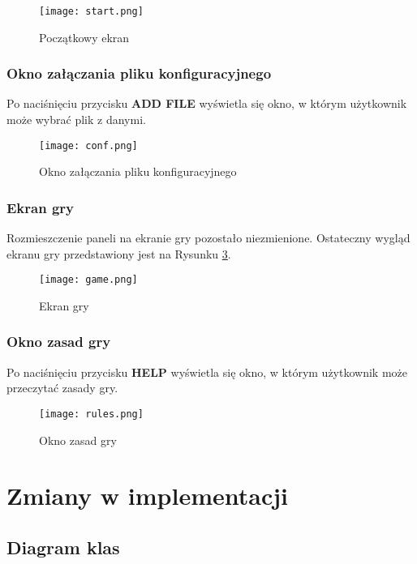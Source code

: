 \documentclass[a4paper]{article}
\begin{document}
\begin{figure}[ht]
    \centering
    \texttt{[image: start.png]}
    \color{lightgray}\caption{Pocz\k{a}tkowy ekran}
    \label{fig:start}
\end{figure}

\subsubsection{Okno za\l{}\k{a}czania pliku konfiguracyjnego}
\quad Po naci\'sni\k{e}ciu przycisku \textbf{ADD FILE} wy\'swietla si\k{e} okno, w kt\'orym u\.zytkownik mo\.ze wybra\'c plik z danymi.

\begin{figure}[ht]
    \centering
    \texttt{[image: conf.png]}
    \color{lightgray}\caption{Okno za\l{}\k{a}czania pliku konfiguracyjnego}
    \label{fig:conf}
\end{figure}

\subsubsection{Ekran gry}
\quad Rozmieszczenie paneli na ekranie gry pozosta\l{}o niezmienione. Ostateczny wygl\k{a}d ekranu gry przedstawiony jest na Rysunku \ref{fig:game}.

\begin{figure}[ht]
    \centering
    \texttt{[image: game.png]}
    \color{lightgray}\caption{Ekran gry}
    \label{fig:game}
\end{figure}

\subsubsection{Okno zasad gry}
\quad Po naci\'sni\k{e}ciu przycisku \textbf{HELP} wy\'swietla si\k{e} okno, w kt\'orym u\.zytkownik mo\.ze przeczyta\'c zasady gry.

\begin{figure}[ht]
    \centering
    \texttt{[image: rules.png]}
    \color{lightgray}\caption{Okno zasad gry}
    \label{fig:rules}
\end{figure}


\section{Zmiany w implementacji}

\subsection{Diagram klas}
\end{document}
